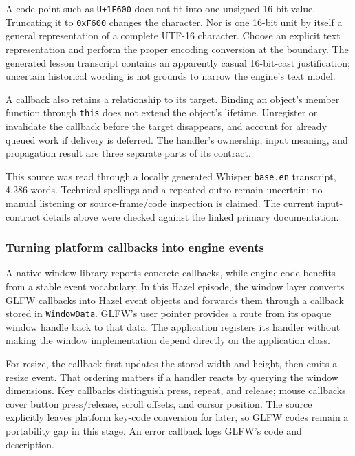 A code point such as \texttt{U+1F600} does not fit into one unsigned 16-bit value. Truncating it to \texttt{0xF600} changes the character. Nor is one 16-bit unit by itself a general representation of a complete UTF-16 character. Choose an explicit text representation and perform the proper encoding conversion at the boundary. The generated lesson transcript contains an apparently casual 16-bit-cast justification; uncertain historical wording is not grounds to narrow the engine's text model.

A callback also retains a relationship to its target. Binding an object's member function through \texttt{this} does not extend the object's lifetime. Unregister or invalidate the callback before the target disappears, and account for already queued work if delivery is deferred. The handler's ownership, input meaning, and propagation result are three separate parts of its contract.

This source was read through a locally generated Whisper \texttt{base.en} transcript, 4,286 words. Technical spellings and a repeated outro remain uncertain; no manual listening or source-frame/code inspection is claimed. The current input-contract details above were checked against the linked primary documentation.

\subsubsection{Turning platform callbacks into engine events}\label{turning-platform-callbacks-into-engine-events}

A native window library reports concrete callbacks, while engine code benefits from a stable event vocabulary. In this Hazel episode, the window layer converts GLFW callbacks into Hazel event objects and forwards them through a callback stored in \texttt{WindowData}. GLFW's user pointer provides a route from its opaque window handle back to that data. The application registers its handler without making the window implementation depend directly on the application class.

For resize, the callback first updates the stored width and height, then emits a resize event. That ordering matters if a handler reacts by querying the window dimensions. Key callbacks distinguish press, repeat, and release; mouse callbacks cover button press/release, scroll offsets, and cursor position. The source explicitly leaves platform key-code conversion for later, so GLFW codes remain a portability gap in this stage. An error callback logs GLFW's code and description.


